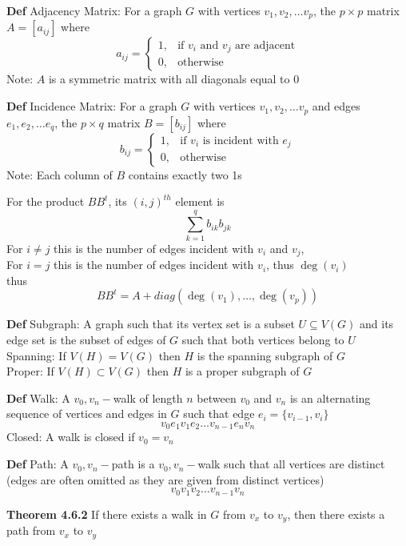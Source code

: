 \documentclass[11pt,notitlepage]{report}
\newcommand{\tbf}[1]{\textbf{#1}}
\begin{document}
\tbf{Def} Adjacency Matrix: For a graph $G$ with vertices $v_1, v_2, \dots v_p$, the $p \times p$ matrix $A = [a_{ij}]$ where
$$a_{ij} = \begin{cases}1, & \text{if $v_i$ and $v_j$ are adjacent}\\
0, &\text{otherwise}\end{cases}$$
\hspace*{5mm} Note: $A$ is a symmetric matrix with all diagonals equal to $0$

\tbf{Def} Incidence Matrix: For a graph $G$ with vertices $v_1, v_2, \dots v_p$ and edges $e_1, e_2, \dots e_q$, the $p \times q$ matrix $B = [b_{ij}]$ where
$$b_{ij} = \begin{cases}1, & \text{if $v_i$ is incident with $e_j$}\\
0, &\text{otherwise}\end{cases}$$
\hspace*{5mm} Note: Each column of $B$ contains exactly two 1s

For the product $BB^t$, its $(i, j)^{th}$ element is
$$\sum_{k=1}^q b_{ik}b_{jk}$$
For $i \ne j$ this is the number of edges incident with $v_i$ and $v_j$,\\
For $i=j$ this is the number of edges incident with $v_i$, thus $\deg(v_i)$\\
thus
$$BB^t = A + diag(\deg{(v_1)}, \dots, \deg{(v_p)})$$

\tbf{Def} Subgraph: A graph such that its vertex set is a subset $U \subseteq V(G)$ and its edge set is the subset of edges of $G$ such that both vertices belong to $U$\\
\hspace*{5mm} Spanning: If $V(H) = V(G)$ then $H$ is the spanning subgraph of $G$\\
\hspace*{5mm} Proper: If $V(H) \subset V(G)$ then $H$ is a proper subgraph of $G$

\tbf{Def} Walk: A $v_0,v_n-$walk of length $n$ between $v_0$ and $v_n$ is an alternating sequence of vertices and edges in $G$ such that edge $e_i = \{v_{i-1}, v_i\}$
$$v_0e_1v_1e_2 \dots v_{n-1}e_nv_n$$
\hspace*{5mm} Closed: A walk is closed if $v_0 = v_n$

\tbf{Def} Path: A $v_0,v_n-$path is a $v_0,v_n-$walk such that all vertices are distinct (edges are often omitted as they are given from distinct vertices)
$$v_0v_1v_2 \dots v_{n-1}v_n$$

\tbf{Theorem 4.6.2} If there exists a walk in $G$ from $v_x$ to $v_y$, then there exists a path from $v_x$ to $v_y$
\end{document}
